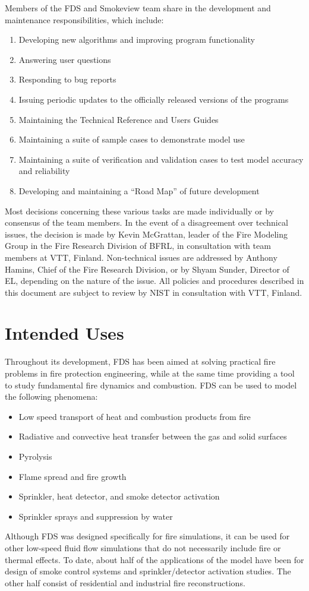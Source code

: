 \documentclass[11pt]{book}
\begin{document}
Members of the FDS and Smokeview team share in the development and maintenance responsibilities, which include:
\begin{enumerate}
\item Developing new algorithms and improving program functionality
\item Answering user questions
\item Responding to bug reports
\item Issuing periodic updates to the officially released versions of the programs
\item Maintaining the Technical Reference and Users Guides
\item Maintaining a suite of sample cases to demonstrate model use
\item Maintaining a suite of verification and validation cases to test model accuracy and reliability
\item Developing and maintaining a ``Road Map'' of future development
\end{enumerate}
Most decisions concerning these various tasks are made individually or by consensus of the team members.
In the event of a disagreement over technical issues, the decision is made by Kevin McGrattan, leader of the Fire Modeling Group in the Fire Research Division of BFRL,
in consultation with team members at VTT, Finland.
Non-technical issues are addressed by Anthony Hamins, Chief of the Fire Research Division, or by
Shyam Sunder, Director of EL, depending on the nature of the issue. All policies and procedures described in this document are
subject to review by NIST in consultation with VTT, Finland.


\section{Intended Uses}

Throughout its development, FDS has been aimed at solving practical fire problems in fire protection engineering, while at the same time providing a
tool to study fundamental fire dynamics and combustion. FDS can be used to model the following phenomena:
\begin{itemize}
\setlength{\itemsep}{0.0in}
\item Low speed transport of heat and combustion products from fire
\item Radiative and convective heat transfer between the gas and solid surfaces
\item Pyrolysis
\item Flame spread and fire growth
\item Sprinkler, heat detector, and smoke detector activation
\item Sprinkler sprays and suppression by water
\end{itemize}
Although FDS was designed specifically for fire simulations, it can be used for other low-speed fluid flow simulations that do not necessarily
include fire or thermal effects. To date, about half of the applications of the model have been for design of smoke control systems and
sprinkler/detector activation studies. The other half consist of residential and industrial fire reconstructions.
\end{document}
